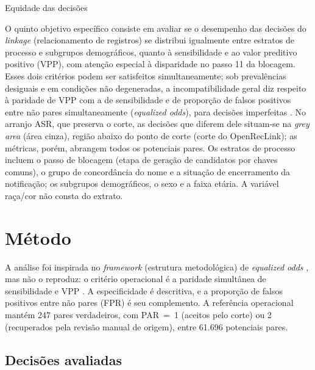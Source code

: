 \begin{chapter}{Equidade das decisões}\label{cap:estudo5}

O quinto objetivo específico consiste em avaliar se o desempenho das decisões do \textit{linkage} (relacionamento de registros) se distribui igualmente entre estratos de processo e subgrupos demográficos, quanto à sensibilidade e ao valor preditivo positivo (VPP), com atenção especial à disparidade no passo 11 da blocagem. Esses dois critérios podem ser satisfeitos simultaneamente; sob prevalências desiguais e em condições não degeneradas, a incompatibilidade geral diz respeito à paridade de VPP com a de sensibilidade e de proporção de falsos positivos entre não pares simultaneamente (\textit{equalized odds}), para decisões imperfeitas \cite{Kleinberg2016inherent,Chouldechova2017fair}. No arranjo ASR, que preserva o corte, as decisões que diferem dele situam-se na \textit{grey area} (área cinza), região abaixo do ponto de corte (corte do OpenRecLink); as métricas, porém, abrangem todos os potenciais pares. Os estratos de processo incluem o passo de blocagem (etapa de geração de candidatos por chaves comuns), o grupo de concordância do nome e a situação de encerramento da notificação; os subgrupos demográficos, o sexo e a faixa etária. A variável raça/cor não consta do extrato.

\section{Método}\label{sec:e5-metodo}

A análise foi inspirada no \textit{framework} (estrutura metodológica) de \textit{equalized odds} \cite{Hardt2016equality}, mas não o reproduz: o critério operacional é a paridade simultânea de sensibilidade e VPP \cite{Barocas2019fairml}. A especificidade é descritiva, e a proporção de falsos positivos entre não pares (FPR) é seu complemento. A referência operacional mantém 247 pares verdadeiros, com PAR~=~1 (aceitos pelo corte) ou 2 (recuperados pela revisão manual de origem), entre 61.696 potenciais pares.

\subsection{Decisões avaliadas}\label{sec:e5-metodo-decisoes}


\end{chapter}
